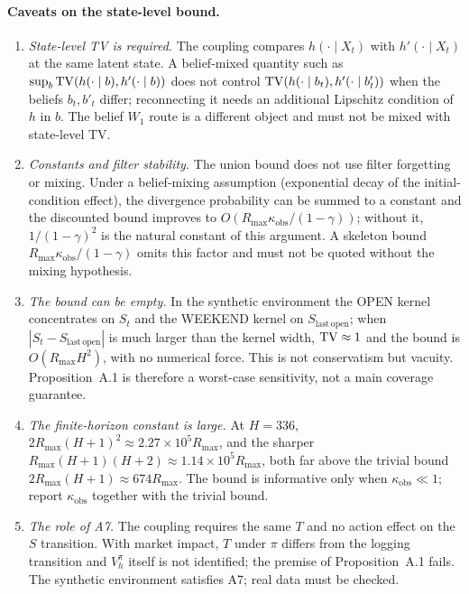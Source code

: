 \paragraph{Caveats on the state-level bound.}
\begin{enumerate}
\item \emph{State-level TV is required.}  The coupling compares
$h(\cdot\mid X_t)$ with $h'(\cdot\mid X_t)$ at the same latent state.  A
belief-mixed quantity such as $\sup_b\mathrm{TV}(h(\cdot\mid b),h'(\cdot\mid b))$ does
not control $\mathrm{TV}(h(\cdot\mid b_t),h'(\cdot\mid b'_t))$ when the beliefs
$b_t,b'_t$ differ; reconnecting it needs an additional Lipschitz condition of
$h$ in $b$.  The belief $W_1$ route is a different object and must not be mixed
with state-level TV.
\item \emph{Constants and filter stability.}  The union bound does not use
filter forgetting or mixing.  Under a belief-mixing assumption (exponential
decay of the initial-condition effect), the divergence probability can be
summed to a constant and the discounted bound improves to
$O(R_{\max}\kappa_{\mathrm{obs}}/(1-\gamma))$; without it,
$1/(1-\gamma)^2$ is the natural constant of this argument.  A skeleton bound
$R_{\max}\kappa_{\mathrm{obs}}/(1-\gamma)$ omits this factor and must not be
quoted without the mixing hypothesis.
\item \emph{The bound can be empty.}  In the synthetic environment the OPEN
kernel concentrates on $S_t$ and the WEEKEND kernel on $S_{\mathrm{last\,open}}$;
when $|S_t-S_{\mathrm{last\,open}}|$ is much larger than the kernel width,
$\mathrm{TV}\approx1$ and the bound is $O(R_{\max}H^2)$, with no numerical force.  This
is not conservatism but vacuity.  Proposition~A.1 is therefore a worst-case
sensitivity, not a main coverage guarantee.
\item \emph{The finite-horizon constant is large.}  At $H=336$,
$2R_{\max}(H+1)^2\approx2.27\times10^5R_{\max}$, and the sharper
$R_{\max}(H+1)(H+2)\approx1.14\times10^5R_{\max}$, both far above the trivial
bound $2R_{\max}(H+1)\approx674R_{\max}$.  The bound is informative only when
$\kappa_{\mathrm{obs}}\ll1$; report $\kappa_{\mathrm{obs}}$ together with the
trivial bound.
\item \emph{The role of A7.}  The coupling requires the same $T$ and no
action effect on the $S$ transition.  With market impact, $T$ under $\pi$ differs
from the logging transition and $V_h^\pi$ itself is not identified; the premise
of Proposition~A.1 fails.  The synthetic environment satisfies A7; real data
must be checked.
\end{enumerate}

